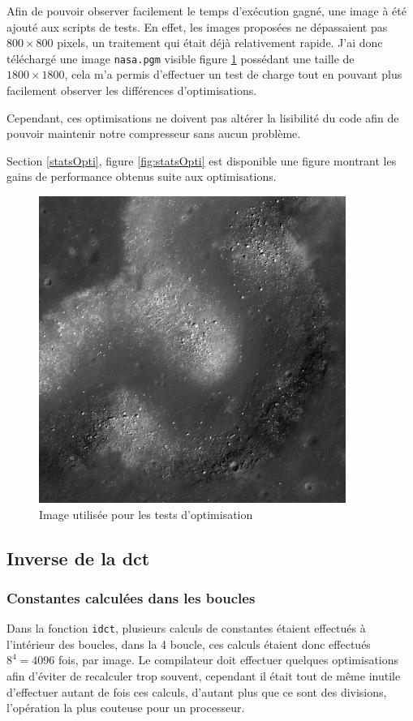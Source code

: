 \documentclass[a4paper, 11pt]{article}
\begin{document}
	Afin de pouvoir observer facilement le temps d'exécution gagné, une image à été ajouté aux scripts de tests. En effet, les images proposées ne dépassaient
	pas $800\times800$ pixels, un traitement qui était déjà relativement rapide. J'ai donc téléchargé une image \texttt{nasa.pgm} visible figure \ref{fig:nasa} possédant une taille de
	$1800\times1800$, cela m'a permis d'effectuer un test de charge tout en pouvant plus facilement observer les différences d'optimisations.

	\begin{remarque}
	Cependant, ces optimisations ne doivent pas altérer la lisibilité du code afin de pouvoir maintenir notre compresseur sans aucun problème.
	\end{remarque}

	Section \ref{statsOpti}, figure \ref{fig:statsOpti} est disponible une figure montrant les gains de performance obtenus suite aux optimisations.

	\begin{figure}[H]
		\centering
		\includegraphics[width=10cm]{nasa.jpg}
		\caption{Image utilisée pour les tests d'optimisation}
		\label{fig:nasa}
	\end{figure}
	
	\subsection{Inverse de la dct}\label{idct}
	\subsubsection{Constantes calculées dans les boucles}
	Dans la fonction \texttt{idct}, plusieurs calculs de constantes étaient effectués à l'intérieur des boucles, dans la 4\ieme{} boucle, ces calculs étaient donc effectués
	$8^4 = 4096$ fois, par image. Le compilateur doit effectuer quelques optimisations afin d'éviter de recalculer trop souvent, cependant il était tout de même
	inutile d'effectuer autant de fois ces calculs, d'autant plus que ce sont des divisions, l'opération la plus couteuse pour un processeur.
\end{document}
